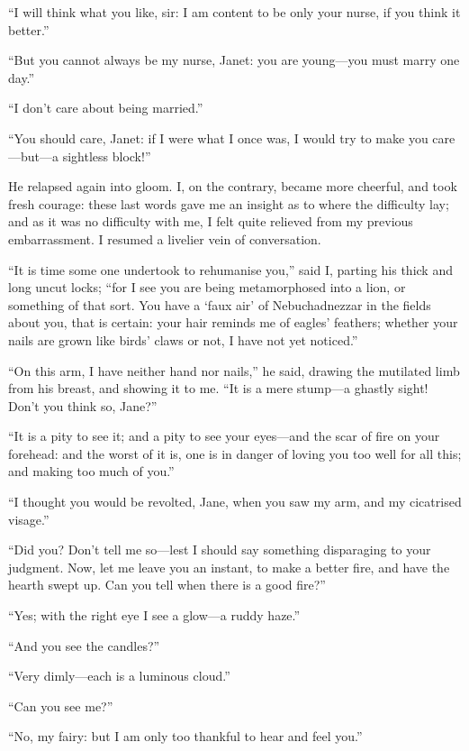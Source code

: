 \enquote{I will think what you like, sir: I am content to be only your
nurse, if you think it better.}

\enquote{But you cannot always be my nurse, Janet: you are young---you
must marry one day.}

\enquote{I don't care about being married.}

\enquote{You should care, Janet: if I were what I once was, I would try
to make you care---but---a sightless block!}

He relapsed again into gloom. I, on the contrary, became more cheerful,
and took fresh courage: these last words gave me an insight as to where
the difficulty lay; and as it was no difficulty with me, I felt quite
relieved from my previous embarrassment. I resumed a livelier vein of
conversation.

\enquote{It is time some one undertook to rehumanise you,} said I,
parting his thick and long uncut locks; \enquote{for I see you are being
metamorphosed into a lion, or something of that sort. You have a
\enquote{faux air} of Nebuchadnezzar in the fields about you, that is
certain: your hair reminds me of eagles' feathers; whether your nails
are grown like birds' claws or not, I have not yet noticed.}

\enquote{On this arm, I have neither hand nor nails,} he said, drawing
the mutilated limb from his breast, and showing it to me. \enquote{It
is a mere stump---a ghastly sight! Don't you think so, Jane?}

\enquote{It is a pity to see it; and a pity to see your eyes---and the
scar of fire on your forehead: and the worst of it is, one is in danger
of loving you too well for all this; and making too much of you.}

\enquote{I thought you would be revolted, Jane, when you saw my arm, and
my cicatrised visage.}

\enquote{Did you? Don't tell me so---lest I should say something
disparaging to your judgment. Now, let me leave you an instant, to make
a better fire, and have the hearth swept up. Can you tell when there is
a good fire?}

\enquote{Yes; with the right eye I see a glow---a ruddy haze.}

\enquote{And you see the candles?}

\enquote{Very dimly---each is a luminous cloud.}

\enquote{Can you see me?}

\enquote{No, my fairy: but I am only too thankful to hear and feel you.}

